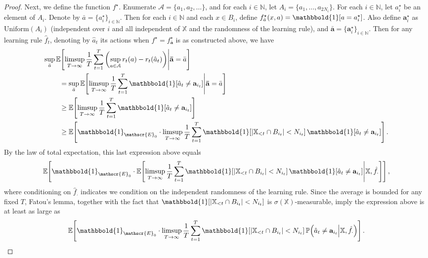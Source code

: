 \documentclass[aos]{imsart}
\theoremstyle{plain}
\theoremstyle{remark}
\newcommand{\Xbb}{\mathbb{X}}
\newcommand{\1}{\mathbbm{1}}%
\newcommand{\Event}{\mathscr{E}}
\newcommand{\A}{\mathcal A}
\renewcommand{\P}{\mathbb P}
\newcommand{\nats}{\mathbb{N}}
\newcommand{\E}{\mathbb E}
\renewcommand{\limsup}{\mathop{\rm limsup}}
\newcommand{\ind}{\mathbbold{1}}
\newcommand{\ProcX}{\mathbb{X}}
\newcommand{\target}{f^{\star}}
\begin{document}
\begin{proof}
Next, we define the function $\target$.
Enumerate $\A = \{a_1,a_2,\ldots\}$, 
and for each $i \in \nats$, let $A_i = \{a_1,\ldots,a_{2N_i}\}$.
For each $i \in \nats$, let 
$a_i^{\star}$ be an element of $A_i$.
Denote by $\bar{a} = \{a_i^{\star}\}_{i \in \nats}$.
Then for each $i \in \nats$ and each $x \in B_i$, 
define $\target_{\bar{a}}(x,a) = \ind[ a = a_i^{\star} ]$.
Also define $\mathbf{a}_i^{\star}$ 
as $\mathrm{Uniform}(A_i)$ 
(independent over $i$ and all independent of $\ProcX$
and the randomness of the learning rule), 
and $\mathbf{\bar{a}} = \{ \mathbf{a}_{i}^{\star} \}_{i \in \nats}$.
Then for any learning rule $\hat{f}_t$, 
denoting by $\hat{a}_t$ its actions when $\target = \target_{\mathbf{\bar{a}}}$ 
is as constructed above, we have  
\begin{align*}
 \sup_{\bar{a}} \E\! &\left[ \limsup_{T \to \infty} \frac{1}{T} \sum_{t=1}^{T} \left( \sup_{a \in \A} r_t(a) - r_t(\hat{a}_t) \right)  \middle| \mathbf{\bar{a}} = \bar{a} \right]\\
&= \sup_{\bar{a}} \E\!\left[ \limsup_{T \to \infty} \frac{1}{T} \sum_{t=1}^{T} \ind\!\left[ \hat{a}_t \neq \mathbf{a}_{i_t} \right]  \middle| \mathbf{\bar{a}} = \bar{a} \right]
\\ & \geq \E\!\left[ \limsup_{T \to \infty} \frac{1}{T} \sum_{t=1}^{T} \ind\!\left[ \hat{a}_t \neq \mathbf{a}_{i_t} \right] \right]\\
&\geq 
\E\!\left[ \ind_{\Event_0} \cdot \limsup_{T \to \infty} \frac{1}{T} \sum_{t=1}^{T} \ind\!\left[ | \Xbb_{< t} \cap B_{i_t}| < N_{i_t} \right] \ind\!\left[ \hat{a}_t \neq \mathbf{a}_{i_t} \right] \right].
\end{align*}
By the law of total expectation, 
this last expression above equals
\begin{equation*}
\E\!\left[ \ind_{\Event_0} \cdot \E\!\left[ \limsup_{T \to \infty} \frac{1}{T} \sum_{t=1}^{T} \ind\!\left[ | \Xbb_{< t} \cap B_{i_t}| < N_{i_t} \right] \ind\!\left[ \hat{a}_t \neq \mathbf{a}_{i_t} \right] \middle| \ProcX, \hat{f}_{\cdot} \right] \right],
\end{equation*}
where conditioning on $\hat{f}_{\cdot}$ 
indicates we condition on the independent 
randomness of the learning rule.
Since the average is bounded for any fixed $T$, 
Fatou's lemma, together with the 
fact that 
$\ind\!\left[ | \Xbb_{< t} \cap B_{i_t}| < N_{i_t} \right]$ 
is $\sigma(\ProcX)$-measurable, 
imply the expression above is at least as large as 
\begin{equation}
\label{eqn:countable-lb-intermediate-1}
\E\!\left[ \ind_{\Event_0} \cdot \limsup_{T \to \infty} \frac{1}{T} \sum_{t=1}^{T} \ind\!\left[ | \Xbb_{< t} \cap B_{i_t}| < N_{i_t} \right] \P\!\left( \hat{a}_t \neq \mathbf{a}_{i_t} \middle| \ProcX, \hat{f}_{\cdot} \right) \right].
\end{equation}


\end{proof}
\end{document}
